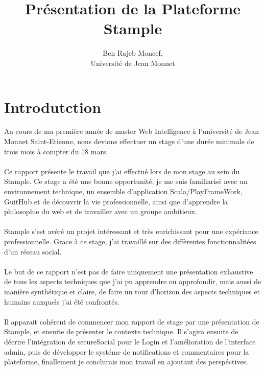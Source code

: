 \documentclass[12pt,oneside,a4paper]{article}
\title{Présentation de la Plateforme Stample\\}
\author{Ben Rajeb Moncef,\\
        Université de Jean Monnet}
\begin{document}
\maketitle
\tableofcontents
\maketitle
\newpage
\section{Introdutction}
Au cours de ma première année de master Web Intelligence à l'université de Jean Monnet Saint-Etienne, nous devions effectuer un stage d'une durée minimale de trois mois à compter du 18 mars.
\paragraph{}
Ce rapport présente le travail que j'ai effectué lors de mon stage au sein du Stample.
\newline
Ce stage a été une bonne opportunité, je me suis familiarisé avec un environnement technique, un ensemble d'application Scala/PlayFrameWork, GuitHub et de découvrir la vie professionnelle, ainsi que d'apprendre la philosophie du web et de travailler avec un groupe ambitieux.
\paragraph{}
Stample s'est avéré un projet intéressant et très enrichissant pour une expériance professionnelle. Grace à ce stage, j'ai travaillé sur des diffèrentes fonctionnalitées d'un réseau social.
\paragraph{}
Le but de ce rapport n’est pas de faire uniquement une présentation exhaustive de tous les aspects techniques que j’ai pu apprendre ou approfondir, mais aussi de manière synthétique et claire, de faire un tour d’horizon des aspects techniques et humains auxquels j’ai été confrontés.
\paragraph{}
Il apparait cohérent de commencer mon rapport de stage par une présentation de Stample, et ensuite de présenter le contexte technique. Il s’agira ensuite de décrire l'intégration de secureSocial pour le Login et l'amélioration de l'interface admin, puis de développer le systéme de notifications et commentaires pour la plateforme, finallement je conclurais mon travail en ajoutant des perspéctives.
\newpage
\end{document}
